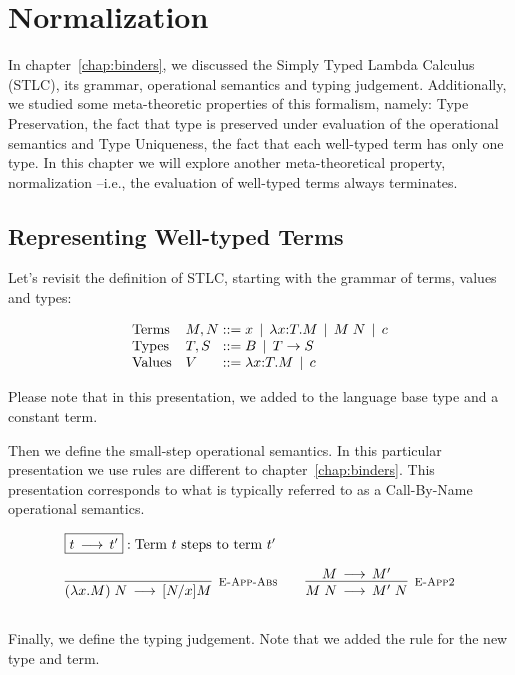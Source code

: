 \chapter{Normalization}

In chapter~\ref{chap:binders}, we discussed the Simply Typed Lambda
Calculus (STLC), its grammar, operational semantics and typing
judgement. Additionally, we studied some meta-theoretic properties of
this formalism, namely: Type Preservation, the fact that type is
preserved under evaluation of the operational semantics and Type
Uniqueness, the fact that each well-typed term has only one type. In
this chapter we will explore another meta-theoretical property,
normalization --i.e., the evaluation of well-typed terms always
terminates.

\section{Representing Well-typed Terms}

Let's revisit the definition of STLC, starting with the grammar of terms, values and types:

\[
\begin{array}{ll@{\bnfas}l}
\mbox{Terms} & M, N & x \bnfalt \lam x{:}T.M \bnfalt M \app N \bnfalt c\\
\mbox{Types} & T, S & B \bnfalt T \arrow S\\
\mbox{Values} & V & \lam x{:}T.M \bnfalt c
\end{array}
\]

Please note that in this presentation, we added to the language base
type and a constant term.

Then we define the small-step operational semantics. In this
particular presentation we use rules are different to
chapter~\ref{chap:binders}. This presentation corresponds to what is
typically referred to as a Call-By-Name operational semantics.

\[
\begin{array}{c}
\multicolumn{1}{l}{\fbox{$t \Steps t'$}: \mbox{Term $t$ steps to term $t'$}}
\\[1em]
\infer[\EAppBeta]{(\lam x.M) \app N \Steps [N/x]M}{} \qquad
\infer[\EAppArgStep]{M \app N \Steps M'\;N}{M \Steps M'} \\[1em]
\end{array}
\]

Finally, we define the typing judgement. Note that we added the rule
\TBase for the new type and term.

